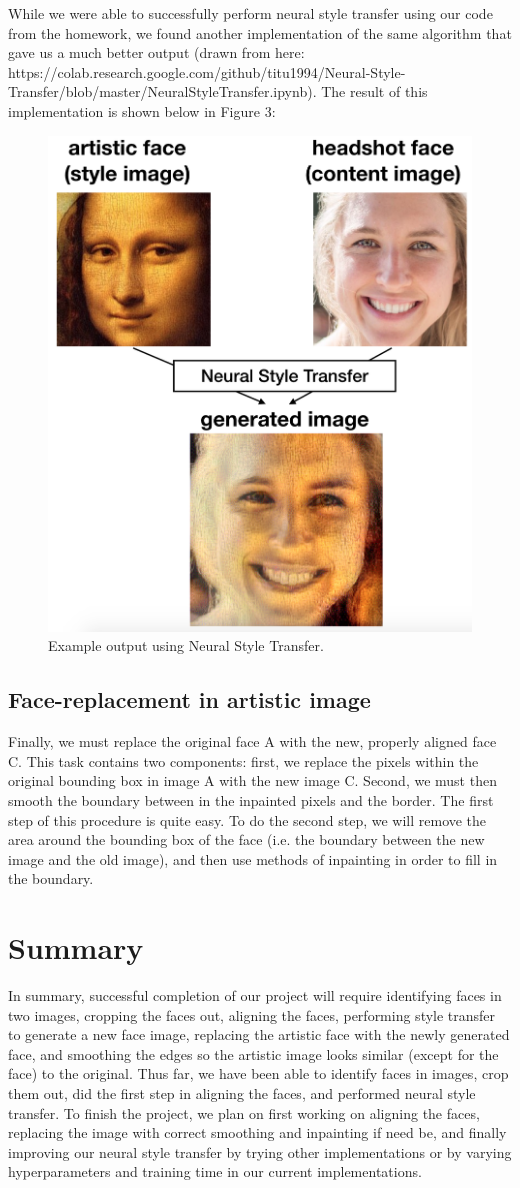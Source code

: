 \documentclass{pnastwo2}
\begin{document}
\begin{article}
While we were able to successfully perform neural style transfer using our code from the homework, we found another implementation of the same algorithm that gave us a much better output (drawn from here: https://colab.research.google.com/github/titu1994/Neural-Style-Transfer/blob/master/NeuralStyleTransfer.ipynb). The result of this implementation is shown below in Figure 3:

\begin{figure}[ht]
	\begin{center}
		\includegraphics[width=.4\textwidth]{neural_style_transfer_output_v2}
		\caption{Example output using Neural Style Transfer.} \label{fig:nst}
	\end{center}
\end{figure} 

\subsection{Face-replacement in artistic image}

Finally, we must replace the original face A with the new, properly aligned face C. This task contains two components: first, we replace the pixels within the original bounding box in image A with the new image C. Second, we must then smooth the boundary between in the inpainted pixels and the border. The first step of this procedure is quite easy. To do the second step, we will remove the area around the bounding box of the face (i.e. the boundary between the new image and the old image), and then use methods of inpainting in order to fill in the boundary. 

\section{Summary}

In summary, successful completion of our project will require identifying faces in two images, cropping the faces out, aligning the faces, performing style transfer to generate a new face image, replacing the artistic face with the newly generated face, and smoothing the edges so the artistic image looks similar (except for the face) to the original. Thus far, we have been able to identify faces in images, crop them out, did the first step in aligning the faces, and performed neural style transfer. To finish the project, we plan on first working on aligning the faces, replacing the image with correct smoothing and inpainting if need be, and finally improving our neural style transfer by trying other implementations or by varying hyperparameters and training time in our current implementations.


\end{article}
\end{document}
